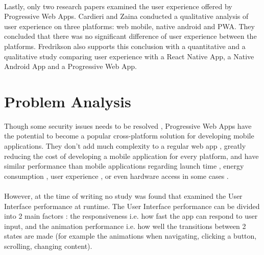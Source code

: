 \documentclass{kththesis}
\begin{document}
\paragraph{}
Lastly, only two research papers examined the user experience offered by Progressive Web Apps. Cardieri and Zaina \cite{PWA_UX_comparison_study} conducted a qualitative analysis of user experience on three platforms: web mobile, native android and PWA. They concluded that there was no significant difference of user experience between the platforms. Fredrikson \cite{emulating_native_w_crossplatform} also supports this conclusion with a quantitative and a qualitative study comparing user experience with a React Native App, a Native Android App and a Progressive Web App. 
\fi


\section{Problem Analysis}


Though some security issues needs to be resolved \cite{Pride_Prejudice}, Progressive Web Apps have the potential to become a popular cross-platform solution for developing mobile applications. They don't add much complexity to a regular web app \cite{JohannsenFabian2018PWAa}, greatly reducing the cost of developing a mobile application for every platform, and have similar performance than mobile applications regarding launch time \cite{PWApossibleUnifer}\cite{Biorn-Hansen2} \cite{PWAapplicability}, energy consumption \cite{PWAapplicability}, user experience \cite{emulating_native_w_crossplatform}\cite{PWA_UX_comparison_study}, or even hardware access in some cases \cite{PWAbc_responsetime}. 
\paragraph{}

However, at the time of writing no study was found that examined the User Interface performance at runtime. The User Interface performance can be divided into 2 main factors : the responsiveness i.e. how fast the app can respond to user input, and the animation performance i.e. how well the transitions between 2 states are made (for example the animations when navigating, clicking a button, scrolling, changing content).
\end{document}
